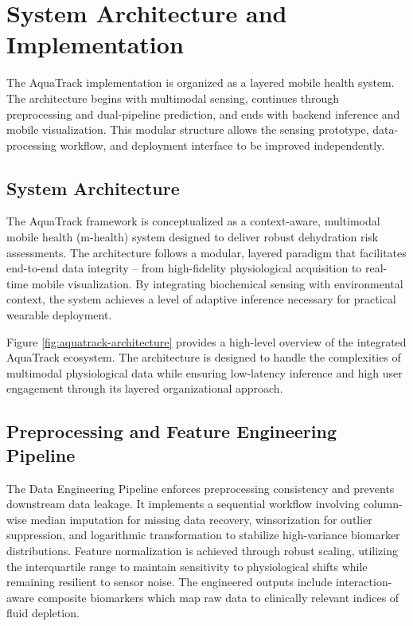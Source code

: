 \chapter{System Architecture and Implementation}
\label{ch:system-architecture}

The AquaTrack implementation is organized as a layered mobile health system. The architecture begins with multimodal sensing, continues through preprocessing and dual-pipeline prediction, and ends with backend inference and mobile visualization. This modular structure allows the sensing prototype, data-processing workflow, and deployment interface to be improved independently.

\section{System Architecture}

The AquaTrack framework is conceptualized as a context-aware, multimodal mobile health (m-health) system designed to deliver robust dehydration risk assessments. The architecture follows a modular, layered paradigm that facilitates end-to-end data integrity -- from high-fidelity physiological acquisition to real-time mobile visualization. By integrating biochemical sensing with environmental context, the system achieves a level of adaptive inference necessary for practical wearable deployment.

Figure \ref{fig:aquatrack-architecture} provides a high-level overview of the integrated AquaTrack ecosystem. The architecture is designed to handle the complexities of multimodal physiological data while ensuring low-latency inference and high user engagement through its layered organizational approach.

\section{Preprocessing and Feature Engineering Pipeline}

The Data Engineering Pipeline enforces preprocessing consistency and prevents downstream data leakage. It implements a sequential workflow involving column-wise median imputation for missing data recovery, winsorization for outlier suppression, and logarithmic transformation to stabilize high-variance biomarker distributions. Feature normalization is achieved through robust scaling, utilizing the interquartile range to maintain sensitivity to physiological shifts while remaining resilient to sensor noise. The engineered outputs include interaction-aware composite biomarkers which map raw data to clinically relevant indices of fluid depletion.


